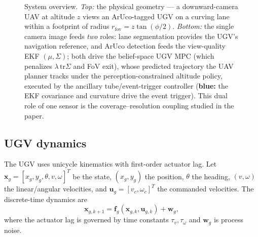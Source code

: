 \documentclass[letterpaper, 10 pt, conference]{ieeeconf}  %
\begin{document}
\begin{figure}[t]
{}
\caption{System overview. \emph{Top:} the physical geometry --- a downward-camera UAV at
altitude $z$ views an ArUco-tagged UGV on a curving lane within a footprint of radius
$r_{\mathrm{fov}}=z\tan(\phi/2)$. \emph{Bottom:} the single camera image feeds \emph{two}
roles: lane segmentation provides the UGV's navigation reference, and ArUco detection feeds the
view-quality EKF $(\mu,\Sigma)$; both drive the belief-space UGV MPC (which penalizes
$\lambda\,\mathrm{tr}\Sigma$ and FoV exit), whose predicted trajectory the UAV planner tracks
under the perception-constrained altitude policy, executed by the ancillary tube/event-trigger
controller (\textbf{blue:} the EKF covariance and curvature drive the event trigger). This
dual role of one sensor is the coverage--resolution coupling studied in the paper.}
\label{fig:system}
\end{figure}

\subsection{UGV dynamics}
The UGV uses unicycle kinematics with first-order actuator lag. Let
$\mathbf{x}_g = [x_g, y_g, \theta, v, \omega]^T$ be the state, $(x_g,y_g)$ the
position, $\theta$ the heading, $(v,\omega)$ the linear/angular velocities, and
$\mathbf{u}_g = [v_c, \omega_c]^T$ the commanded velocities. The discrete-time
dynamics are
\begin{equation}
\mathbf{x}_{g,k+1} = \mathbf{f}_g(\mathbf{x}_{g,k}, \mathbf{u}_{g,k}) + \mathbf{w}_g,
\end{equation}
where the actuator lag is governed by time constants $\tau_v,\tau_\omega$ and
$\mathbf{w}_g$ is process noise.
\end{document}
